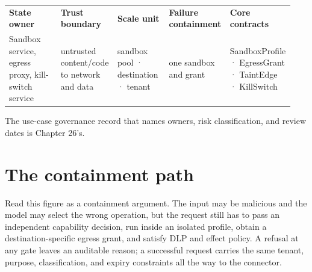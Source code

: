 \BookTableStart
\fontsize{7.2}{9}\selectfont
\begin{tabular}{@{}Y{0.1880\linewidth}Y{0.1880\linewidth}Y{0.1880\linewidth}Y{0.1880\linewidth}Y{0.1880\linewidth}@{}}
\color{white}\bfseries \textbf{State owner} & \color{white}\bfseries \textbf{Trust boundary} & \color{white}\bfseries \textbf{Scale unit} & \color{white}\bfseries \textbf{Failure containment} & \color{white}\bfseries \textbf{Core contracts} \\
Sandbox service, egress proxy, kill-switch service & untrusted content/code to network and data & sandbox pool · destination · tenant & one sandbox and grant & SandboxProfile · EgressGrant · TaintEdge · KillSwitch \\
\end{tabular}
\BookTableEnd

The use-case governance record that names owners, risk classification, and review dates is Chapter 26's.\par

\section{The containment path}


Read this figure as a containment argument. The input may be malicious and the model may select the wrong operation, but the request still has to pass an independent capability decision, run inside an isolated profile, obtain a destination-specific egress grant, and satisfy DLP and effect policy. A refusal at any gate leaves an auditable reason; a successful request carries the same tenant, purpose, classification, and expiry constraints all the way to the connector.\par

